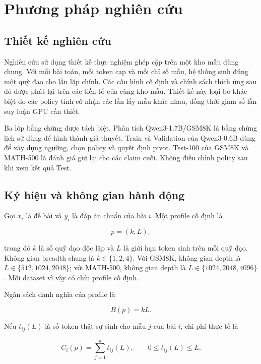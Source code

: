 \chapter{Phương pháp nghiên cứu}
\label{chap:methodology}

\section{Thiết kế nghiên cứu}

Nghiên cứu sử dụng thiết kế thực nghiệm ghép cặp trên một kho mẫu dùng chung. Với mỗi
bài toán, mỗi token cap và mỗi chỉ số mẫu, hệ thống sinh đúng một quỹ đạo cho lần lặp
chính. Các cấu hình cố định và chính sách thích ứng sau đó được phát lại trên các tiền
tố của cùng kho mẫu. Thiết kế này loại bỏ khác biệt do các policy tình cờ nhận các lần
lấy mẫu khác nhau, đồng thời giảm số lần suy luận GPU cần thiết.

Ba lớp bằng chứng được tách biệt. Phân tích Qwen3-1.7B/GSM8K là bằng chứng lịch sử dùng
để hình thành giả thuyết. Train và Validation của Qwen3-0.6B dùng để xây dựng ngưỡng,
chọn policy và quyết định pivot. Test-100 của GSM8K và MATH-500 là đánh giá giữ lại
cho các claim cuối. Không điều chỉnh policy sau khi xem kết quả Test.

\section{Ký hiệu và không gian hành động}

Gọi $x_i$ là đề bài và $y_i$ là đáp án chuẩn của bài $i$. Một profile cố định là

\begin{equation}
  p=(k,L),
\end{equation}

trong đó $k$ là số quỹ đạo độc lập và $L$ là giới hạn token sinh trên mỗi quỹ đạo.
Không gian breadth chung là $k\in\{1,2,4\}$. Với GSM8K, không gian depth là
$L\in\{512,1024,2048\}$; với MATH-500, không gian depth là
$L\in\{1024,2048,4096\}$. Mỗi dataset vì vậy có chín profile cố định.

Ngân sách danh nghĩa của profile là

\begin{equation}
  B(p)=kL.
\end{equation}

Nếu $t_{ij}(L)$ là số token thật sự sinh cho mẫu $j$ của bài $i$, chi phí thực tế là

\begin{equation}
  C_i(p)=\sum_{j=1}^{k}t_{ij}(L), \qquad 0\leq t_{ij}(L)\leq L.
  \label{eq:realized-cost}
\end{equation}

